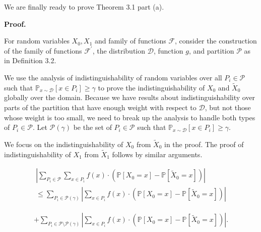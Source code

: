 We are finally ready to prove Theorem 3.1 part (a).\par





\par\medskip\noindent\textbf{Proof.}\par




For random variables $X_{0},X_{1}$ and family of functions $\mathcal{F}$, consider the construction of the family of functions $\mathcal{F}^{\prime}$, the distribution $\mathcal{D}$, function $g$, and partition $\mathcal{P}$ as in Definition 3.2.\par




We use the analysis of indistinguishability of random variables over all $P_{i}\in\mathcal{P}$ such that $\mathbb{P}_{x\sim\mathcal{D}}[x\in P_{i}]\geq\gamma$ to prove the indistinguishability of $X_{0}$ and $\widetilde{X}_{0}$ globally over the domain. Because we have results about indistinguishability over parts of the partition that have enough weight with respect to $\mathcal{D}$, but not those whose weight is too small, we need to break up the analysis to handle both types of $P_{i}\in\mathcal{P}$. Let $\mathcal{P}(\gamma)$ be the set of $P_{i}\in\mathcal{P}$ such that $\mathbb{P}_{x\sim\mathcal{D}}[x\in P_{i}]\geq\gamma$.\par




We focus on the indistinguishability of $X_{0}$ from $\widetilde{X}_{0}$ in the proof. The proof of indistinguishability of $X_{1}$ from $\widetilde{X}_{1}$ follows by similar arguments.\par


\[\begin{gathered}
\displaystyle\left|\sum_{P_{i}\in\mathcal{P}}\sum_{x\in P_{i}}f(x)\cdot\left(\mathbb{P}[X_{0}=x]-\mathbb{P}[\widetilde{X}_{0}=x]\right)\right| \\
\displaystyle\leq\sum_{P_{i}\in\mathcal{P}(\gamma)}\left|\sum_{x\in P_{i}}f(x)\cdot\left(\mathbb{P}[X_{0}=x]-\mathbb{P}[\widetilde{X}_{0}=x]\right)\right|
\end{gathered}\]


\[\begin{gathered}
+\sum_{P_{i}\in\mathcal{P}\setminus\mathcal{P}(\gamma)}\left|\sum_{x\in P_{i}}f(x)\cdot\left(\mathbb{P}[X_{0}=x]-\mathbb{P}[\widetilde{X}_{0}=x]\right)\right|.
\end{gathered}\]


